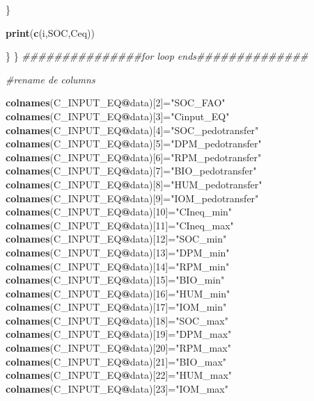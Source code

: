 \documentclass[
  10pt,
  b5paper,
]{book}
\newenvironment{Shaded}{\begin{snugshade}}{\end{snugshade}}
\newcommand{\CommentTok}[1]{\textcolor[rgb]{0.56,0.35,0.01}{\textit{#1}}}
\newcommand{\DecValTok}[1]{\textcolor[rgb]{0.00,0.00,0.81}{#1}}
\newcommand{\KeywordTok}[1]{\textcolor[rgb]{0.13,0.29,0.53}{\textbf{#1}}}
\newcommand{\NormalTok}[1]{#1}
\newcommand{\OperatorTok}[1]{\textcolor[rgb]{0.81,0.36,0.00}{\textbf{#1}}}
\newcommand{\StringTok}[1]{\textcolor[rgb]{0.31,0.60,0.02}{#1}}
\begin{document}
\begin{Shaded}
\begin{Highlighting}[]
{\NormalTok{\}}

\KeywordTok{print}\NormalTok{(}\KeywordTok{c}\NormalTok{(i,SOC,Ceq))}

\NormalTok{\}}
\NormalTok{\}}
\CommentTok{###############for loop ends##############}


\CommentTok{#rename de columns}

\KeywordTok{colnames}\NormalTok{(C_INPUT_EQ}\OperatorTok{@}\NormalTok{data)[}\DecValTok{2}\NormalTok{]=}\StringTok{"SOC_FAO"}
\KeywordTok{colnames}\NormalTok{(C_INPUT_EQ}\OperatorTok{@}\NormalTok{data)[}\DecValTok{3}\NormalTok{]=}\StringTok{"Cinput_EQ"}
\KeywordTok{colnames}\NormalTok{(C_INPUT_EQ}\OperatorTok{@}\NormalTok{data)[}\DecValTok{4}\NormalTok{]=}\StringTok{"SOC_pedotransfer"}
\KeywordTok{colnames}\NormalTok{(C_INPUT_EQ}\OperatorTok{@}\NormalTok{data)[}\DecValTok{5}\NormalTok{]=}\StringTok{"DPM_pedotransfer"}
\KeywordTok{colnames}\NormalTok{(C_INPUT_EQ}\OperatorTok{@}\NormalTok{data)[}\DecValTok{6}\NormalTok{]=}\StringTok{"RPM_pedotransfer"}
\KeywordTok{colnames}\NormalTok{(C_INPUT_EQ}\OperatorTok{@}\NormalTok{data)[}\DecValTok{7}\NormalTok{]=}\StringTok{"BIO_pedotransfer"}
\KeywordTok{colnames}\NormalTok{(C_INPUT_EQ}\OperatorTok{@}\NormalTok{data)[}\DecValTok{8}\NormalTok{]=}\StringTok{"HUM_pedotransfer"}
\KeywordTok{colnames}\NormalTok{(C_INPUT_EQ}\OperatorTok{@}\NormalTok{data)[}\DecValTok{9}\NormalTok{]=}\StringTok{"IOM_pedotransfer"}
\KeywordTok{colnames}\NormalTok{(C_INPUT_EQ}\OperatorTok{@}\NormalTok{data)[}\DecValTok{10}\NormalTok{]=}\StringTok{"CIneq_min"}
\KeywordTok{colnames}\NormalTok{(C_INPUT_EQ}\OperatorTok{@}\NormalTok{data)[}\DecValTok{11}\NormalTok{]=}\StringTok{"CIneq_max"}
\KeywordTok{colnames}\NormalTok{(C_INPUT_EQ}\OperatorTok{@}\NormalTok{data)[}\DecValTok{12}\NormalTok{]=}\StringTok{"SOC_min"}
\KeywordTok{colnames}\NormalTok{(C_INPUT_EQ}\OperatorTok{@}\NormalTok{data)[}\DecValTok{13}\NormalTok{]=}\StringTok{"DPM_min"}
\KeywordTok{colnames}\NormalTok{(C_INPUT_EQ}\OperatorTok{@}\NormalTok{data)[}\DecValTok{14}\NormalTok{]=}\StringTok{"RPM_min"}
\KeywordTok{colnames}\NormalTok{(C_INPUT_EQ}\OperatorTok{@}\NormalTok{data)[}\DecValTok{15}\NormalTok{]=}\StringTok{"BIO_min"}
\KeywordTok{colnames}\NormalTok{(C_INPUT_EQ}\OperatorTok{@}\NormalTok{data)[}\DecValTok{16}\NormalTok{]=}\StringTok{"HUM_min"}
\KeywordTok{colnames}\NormalTok{(C_INPUT_EQ}\OperatorTok{@}\NormalTok{data)[}\DecValTok{17}\NormalTok{]=}\StringTok{"IOM_min"}
\KeywordTok{colnames}\NormalTok{(C_INPUT_EQ}\OperatorTok{@}\NormalTok{data)[}\DecValTok{18}\NormalTok{]=}\StringTok{"SOC_max"}
\KeywordTok{colnames}\NormalTok{(C_INPUT_EQ}\OperatorTok{@}\NormalTok{data)[}\DecValTok{19}\NormalTok{]=}\StringTok{"DPM_max"}
\KeywordTok{colnames}\NormalTok{(C_INPUT_EQ}\OperatorTok{@}\NormalTok{data)[}\DecValTok{20}\NormalTok{]=}\StringTok{"RPM_max"}
\KeywordTok{colnames}\NormalTok{(C_INPUT_EQ}\OperatorTok{@}\NormalTok{data)[}\DecValTok{21}\NormalTok{]=}\StringTok{"BIO_max"}
\KeywordTok{colnames}\NormalTok{(C_INPUT_EQ}\OperatorTok{@}\NormalTok{data)[}\DecValTok{22}\NormalTok{]=}\StringTok{"HUM_max"}
\KeywordTok{colnames}\NormalTok{(C_INPUT_EQ}\OperatorTok{@}\NormalTok{data)[}\DecValTok{23}\NormalTok{]=}\StringTok{"IOM_max"}

}
\end{Highlighting}
\end{Shaded}
\end{document}
